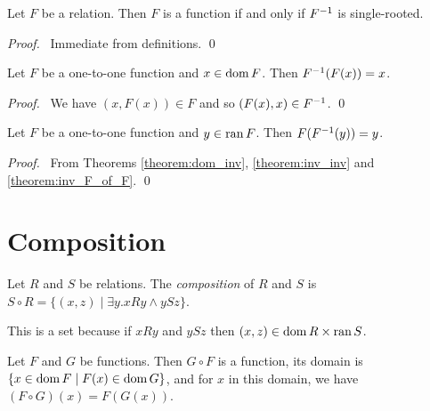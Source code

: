 \begin{theorem}
    Let $F$ be a relation. Then $F$ is a function if and only if ${F}^{-1}$ is single-rooted.
\end{theorem}

\begin{proof}
    \pf\ Immediate from definitions. \qed
\end{proof}

\begin{theorem}
    \label{theorem:inv_F_of_F}
    Let $F$ be a one-to-one function and $x \in \operatorname{dom} F$. Then ${F}^{-1}(F(x)) = x$.
\end{theorem}

\begin{proof}
    \pf\ We have $(x, F(x)) \in F$ and so $(F(x), x) \in {F}^{-1}$. \qed
\end{proof}

\begin{theorem}
    Let $F$ be a one-to-one function and $y \in \operatorname{ran} F$. Then $F({F}^{-1}(y)) = y$.
\end{theorem}

\begin{proof}
    \pf\ From Theorems \ref{theorem:dom_inv}, \ref{theorem:inv_inv} and \ref{theorem:inv_F_of_F}. \qed
\end{proof}

\section{Composition}

\begin{definition}
    Let $R$ and $S$ be relations. The \emph{composition} of $R$ and $S$ is $S \circ R = \{ (x,z) \mid \exists y. xRy \wedge ySz \}$.
    
    This is a set because if $xRy$ and $ySz$ then $(x,z) \in \operatorname{dom} R \times \operatorname{ran} S$.
\end{definition}

\begin{theorem}
    Let $F$ and $G$ be functions. Then $G \circ F$ is a function, its domain
    is $\{ x \in \operatorname{dom} F \mid F(x) \in \operatorname{dom} G \}$, and for $x$ in this domain,
    we have $(F \circ G)(x) = F(G(x))$.
\end{theorem}

